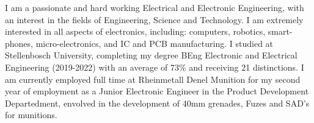 

I am a passionate and hard working Electrical and Electronic Engineering, with an interest in the fields of Engineering, Science and Technology. I am extremely interested in all aspects of electronics, including: computers,  robotics, smart-phones, micro-electronics, and IC and PCB manufacturing. I studied at Stellenbosch University, completing my degree BEng Electronic and Electrical Engineering (2019-2022) with an average of 73\% and receiving 21 distinctions. I am currently employed full time at Rheinmetall Denel Munition for my second year of employment as a Junior Electronic Engineer in the Product Development Departedment, envolved in the development of 40mm grenades, Fuzes and SAD's for munitions.

